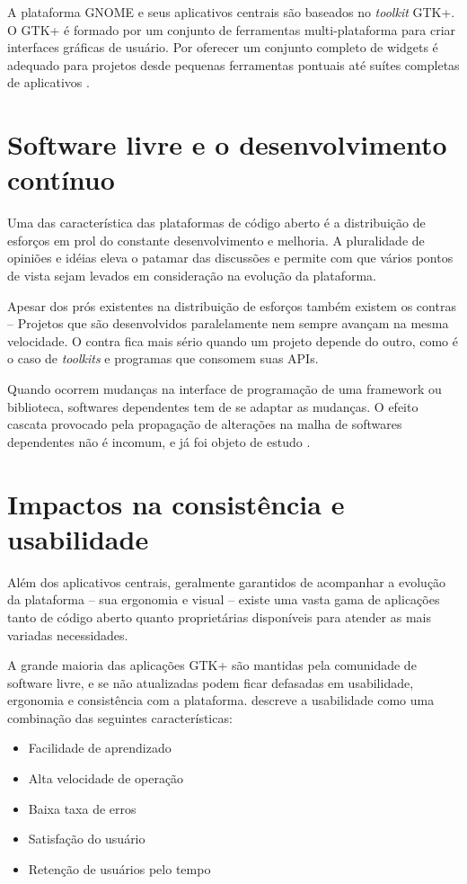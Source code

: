 A plataforma GNOME e seus aplicativos centrais são baseados no \textit{toolkit}
GTK+. O GTK+ é formado por um conjunto de ferramentas multi-plataforma para
criar interfaces gráficas de usuário. Por oferecer um conjunto completo de
widgets é adequado para projetos desde pequenas ferramentas pontuais até suítes
completas de aplicativos \cite{gtk-org}.

\section{Software livre e o desenvolvimento contínuo}

Uma das característica das plataformas de código aberto é a distribuição de
esforços em prol do constante desenvolvimento e melhoria. A pluralidade de
opiniões e idéias eleva o patamar das discussões e permite com que vários pontos
de vista sejam levados em consideração na evolução da plataforma.

Apesar dos prós existentes na distribuição de esforços também existem os contras
-- Projetos que são desenvolvidos paralelamente nem sempre avançam na mesma
velocidade. O contra fica mais sério quando um projeto depende do outro, como é
o caso de \textit{toolkits} e programas que consomem suas APIs.

Quando ocorrem mudanças na interface de programação de uma framework ou
biblioteca, softwares dependentes tem de se adaptar as mudanças. O efeito
cascata provocado pela propagação de alterações na malha de softwares
dependentes não é incomum, e já foi objeto de estudo \cite{yau1978ripple}.

\section{Impactos na consistência e usabilidade}

Além dos aplicativos centrais, geralmente garantidos de acompanhar a evolução
da plataforma -- sua ergonomia e visual -- existe uma vasta gama de aplicações
tanto de código aberto quanto proprietárias disponíveis para atender as mais
variadas necessidades.

A grande maioria das aplicações GTK+ são mantidas pela comunidade de software
livre, e se não atualizadas podem ficar defasadas em usabilidade, ergonomia e
consistência com a plataforma.  descreve
a usabilidade como uma combinação das seguintes características:

\begin{itemize}
    \item Facilidade de aprendizado
    \item Alta velocidade de operação
    \item Baixa taxa de erros
    \item Satisfação do usuário
    \item Retenção de usuários pelo tempo
\end{itemize}

